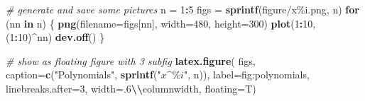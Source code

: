 \documentclass[a4paper,conference]{IEEEtran}
\newenvironment{Shaded}{\begin{snugshade}}{\end{snugshade}}
\newcommand{\AttributeTok}[1]{\textcolor[rgb]{0.13,0.29,0.53}{#1}}
\newcommand{\CommentTok}[1]{\textcolor[rgb]{0.56,0.35,0.01}{\textit{#1}}}
\newcommand{\ControlFlowTok}[1]{\textcolor[rgb]{0.13,0.29,0.53}{\textbf{#1}}}
\newcommand{\DecValTok}[1]{\textcolor[rgb]{0.00,0.00,0.81}{#1}}
\newcommand{\FunctionTok}[1]{\textcolor[rgb]{0.13,0.29,0.53}{\textbf{#1}}}
\newcommand{\NormalTok}[1]{#1}
\newcommand{\OtherTok}[1]{\textcolor[rgb]{0.56,0.35,0.01}{#1}}
\newcommand{\SpecialCharTok}[1]{\textcolor[rgb]{0.81,0.36,0.00}{\textbf{#1}}}
\newcommand{\StringTok}[1]{\textcolor[rgb]{0.31,0.60,0.02}{#1}}
\begin{document}
\begin{Shaded}
\begin{Highlighting}[]
\CommentTok{\# generate and save some pictures}
\NormalTok{n }\OtherTok{=} \DecValTok{1}\SpecialCharTok{:}\DecValTok{5}
\NormalTok{figs }\OtherTok{=} \FunctionTok{sprintf}\NormalTok{(}\StringTok{\textquotesingle{}figure/x\%i.png\textquotesingle{}}\NormalTok{, n)}
\ControlFlowTok{for}\NormalTok{ (nn }\ControlFlowTok{in}\NormalTok{ n) \{}
  \FunctionTok{png}\NormalTok{(}\AttributeTok{filename=}\NormalTok{figs[nn], }\AttributeTok{width=}\DecValTok{480}\NormalTok{, }\AttributeTok{height=}\DecValTok{300}\NormalTok{)}
  \FunctionTok{plot}\NormalTok{(}\DecValTok{1}\SpecialCharTok{:}\DecValTok{10}\NormalTok{, (}\DecValTok{1}\SpecialCharTok{:}\DecValTok{10}\NormalTok{)}\SpecialCharTok{\^{}}\NormalTok{nn)}
  \FunctionTok{dev.off}\NormalTok{()}
\NormalTok{\}}

\CommentTok{\# show as floating figure with 3 subfig}
\FunctionTok{latex.figure}\NormalTok{(}
\NormalTok{  figs,}
  \AttributeTok{caption=}\FunctionTok{c}\NormalTok{(}\StringTok{"Polynomials"}\NormalTok{,}
            \FunctionTok{sprintf}\NormalTok{(}\StringTok{"$x\^{}\%i$"}\NormalTok{, n)),}
  \AttributeTok{label=}\StringTok{\textquotesingle{}fig:polynomials\textquotesingle{}}\NormalTok{,}
  \AttributeTok{linebreaks.after=}\DecValTok{3}\NormalTok{,}
  \AttributeTok{width=}\StringTok{\textquotesingle{}.6}\SpecialCharTok{\textbackslash{}\textbackslash{}}\StringTok{columnwidth\textquotesingle{}}\NormalTok{,}
  \AttributeTok{floating=}\NormalTok{T)}
\end{Highlighting}
\end{Shaded}
\end{document}
